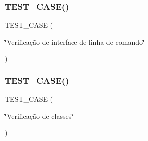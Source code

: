 \subsubsection{T\+E\+S\+T\+\_\+\+C\+A\+S\+E()\hspace{0.1cm}{\footnotesize\ttfamily [1/2]}}
{\footnotesize\ttfamily T\+E\+S\+T\+\_\+\+C\+A\+SE (\begin{DoxyParamCaption}\item[{\char`\"{}Verificação de interface de linha de comando\char`\"{}}]{ }\end{DoxyParamCaption})}

\mbox{\label{test_8cpp_a3a182bbcfc11483ae194a7fdfd431803}} 
\subsubsection{T\+E\+S\+T\+\_\+\+C\+A\+S\+E()\hspace{0.1cm}{\footnotesize\ttfamily [2/2]}}
{\footnotesize\ttfamily T\+E\+S\+T\+\_\+\+C\+A\+SE (\begin{DoxyParamCaption}\item[{\char`\"{}Verificação de classes\char`\"{}}]{ }\end{DoxyParamCaption})}

